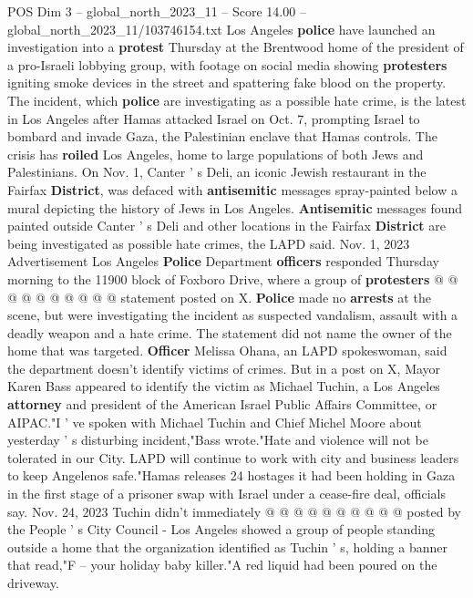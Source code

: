 \begin{textsample}{POS Dim 3 – global\_north\_2023\_11 – Score 14.00 – global\_north\_2023\_11/103746154.txt}  \label{ex:f3_pos_171}
Los Angeles \textbf{police} have launched an investigation into a \textbf{protest} Thursday at the Brentwood home of the president of a pro-Israeli lobbying group, with footage on social media showing \textbf{protesters} igniting smoke devices in the street and spattering fake blood on the property.
The incident, which \textbf{police} are investigating as a possible hate crime, is the latest in Los Angeles after Hamas attacked Israel on Oct. 7, prompting Israel to bombard and invade Gaza, the Palestinian enclave that Hamas controls.
The crisis has \textbf{roiled} Los Angeles, home to large populations of both Jews and Palestinians.
On Nov. 1, Canter ' s Deli, an iconic Jewish restaurant in the Fairfax \textbf{District}, was defaced with \textbf{antisemitic} messages spray-painted below a mural depicting the history of Jews in Los Angeles. \textbf{Antisemitic} messages found painted outside Canter ' s Deli and other locations in the Fairfax \textbf{District} are being investigated as possible hate crimes, the LAPD said.
Nov. 1, 2023 Advertisement Los Angeles \textbf{Police} Department \textbf{officers} responded Thursday morning to the 11900 block of Foxboro Drive, where a group of \textbf{protesters} @ @ @ @ @ @ @ @ @ @ statement posted on X. \textbf{Police} made no \textbf{arrests} at the scene, but were investigating the incident as suspected vandalism, assault with a deadly weapon and a hate crime.
The statement did not name the owner of the home that was targeted. \textbf{Officer} Melissa Ohana, an LAPD spokeswoman, said the department doesn't identify victims of crimes.
But in a post on X, Mayor Karen Bass appeared to identify the victim as Michael Tuchin, a Los Angeles \textbf{attorney} and president of the American Israel Public Affairs Committee, or AIPAC."I ' ve spoken with Michael Tuchin and Chief Michel Moore about yesterday ' s disturbing incident,"Bass wrote."Hate and violence will not be tolerated in our City.
LAPD will continue to work with city and business leaders to keep Angelenos safe."Hamas releases 24 hostages it had been holding in Gaza in the first stage of a prisoner swap with Israel under a cease-fire deal, officials say.
Nov. 24, 2023 Tuchin didn't immediately @ @ @ @ @ @ @ @ @ @ posted by the People ' s City Council - Los Angeles showed a group of people standing outside a home that the organization identified as Tuchin ' s, holding a banner that read,"F -- your holiday baby killer."A red liquid had been poured on the driveway.

\end{textsample}
